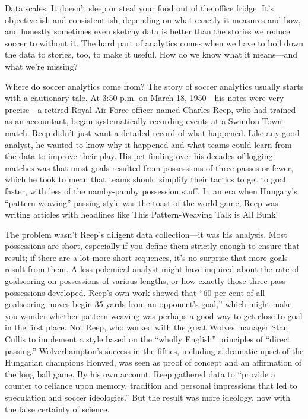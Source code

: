 Data scales. It doesn’t sleep or steal your food out of the office fridge. 
It’s objective-ish and consistent-ish, depending on what exactly it measures 
and how, and honestly sometimes even sketchy data is better than the stories 
we reduce soccer to without it. The hard part of analytics comes when 
we have to boil down the data to stories, too, to make it useful. How do 
we know what it means—and what we’re missing?

Where do soccer analytics come from?
The story of soccer analytics usually starts with a cautionary tale. At 3:50 
p.m. on March 18, 1950—his notes were very precise—a retired Royal Air Force 
officer named Charles Reep, who had trained as an accountant, began 
systematically recording events at a Swindon Town match. Reep didn’t just 
want a detailed record of what happened. Like any good analyst, he wanted 
to know why it happened and what teams could learn from the data to 
improve their play. His pet finding over his decades of logging matches 
was that most goals resulted from possessions of three passes or fewer, 
which he took to mean that teams should simplify their tactics to get 
to goal faster, with less of the namby-pamby possession stuff. In an 
era when Hungary’s “pattern-weaving” passing style was the toast of 
the world game, Reep was writing articles with headlines like This 
Pattern-Weaving Talk is All Bunk!

The problem wasn’t Reep’s diligent data collection—it was his analysis. Most 
possessions are short, especially if you define them strictly enough to 
ensure that result; if there are a lot more short sequences, it’s no 
surprise that more goals result from them. A less polemical analyst 
might have inquired about the rate of goalscoring on possessions of various 
lengths, or how exactly those three-pass possessions developed. Reep’s own 
work showed that “60 per cent of all goalscoring moves begin 35 yards from 
an opponent’s goal,” which might make you wonder whether pattern-weaving was 
perhaps a good way to get close to goal in the first place. Not Reep, who 
worked with the great Wolves manager Stan Cullis to implement a style based 
on the “wholly English” principles of “direct passing.” Wolverhampton’s 
success in the fifties, including a dramatic upset of the Hungarian 
champions Honved, was seen as proof of concept and an affirmation of the 
long ball game. By his own account, Reep gathered data to “provide a 
counter to reliance upon memory, tradition and personal impressions 
that led to speculation and soccer ideologies.” But the result was 
more ideology, now with the false certainty of science.

